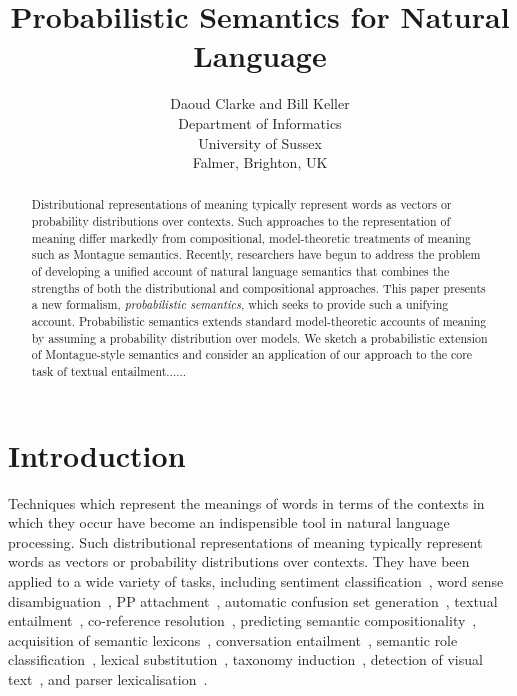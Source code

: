\documentclass[letterpaper]{article}
\begin{document}
%
\title{Probabilistic Semantics for Natural Language}
\author{Daoud Clarke and Bill Keller\\
Department of Informatics\\
University of Sussex\\
Falmer, Brighton, UK\\
}
\maketitle
\begin{abstract}
Distributional representations of meaning typically
represent words as vectors or probability distributions over
contexts. Such approaches to the representation of meaning differ markedly from compositional, model-theoretic treatments of meaning
such as Montague semantics. Recently, researchers have begun to address the problem of  developing a unified account of natural language semantics that combines the strengths of both the distributional and compositional approaches. This paper presents a new formalism, {\em probabilistic semantics\/}, which seeks to provide such a unifying account. Probabilistic semantics extends standard model-theoretic
accounts of meaning by assuming a probability distribution over
models. We sketch a probabilistic extension of Montague-style semantics and consider an application of our approach to the core task of textual entailment......


\end{abstract}


\section{Introduction}

Techniques which represent the meanings of words in terms of the contexts in
which they occur have become an indispensible tool in natural language
processing. Such distributional representations of meaning typically
represent words as vectors or probability distributions over
contexts. They have been applied to a wide variety of tasks,
including sentiment classification~\cite{Bollegala2011}, word sense
disambiguation~\cite{miller-EtAl:2012:PAPERS,khapra-EtAl:2010:ACL}, PP
attachment~\cite{Calvo05distributionalthesaurus}, automatic confusion
set generation~\cite{xue-hwa:2012:PAPERS}, textual
entailment~\cite{berant-dagan-goldberger:2010:ACL}, co-reference
resolution~\cite{lee-EtAl:2012:EMNLP-CoNLL}, predicting semantic
compositionality~\cite{bergsma-EtAl:2010:EMNLP}, acquisition of
semantic lexicons~\cite{mcintosh:2010:EMNLP}, conversation
entailment~\cite{zhang-chai:2010:EMNLP}, semantic role
classification~\cite{zapirain-EtAl:2010:NAACLHLT}, lexical
substitution~\cite{szarvas-biemann-gurevych:2013:NAACL-HLT}, taxonomy
induction~\cite{fountain-lapata:2012:NAACL-HLT}, detection of visual
text~\cite{dodge-EtAl:2012:NAACL-HLT}, and parser
lexicalisation~\cite{rei-briscoe:2013:NAACL-HLT}.
\end{document}
